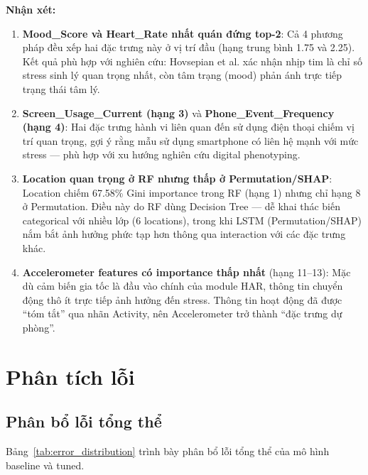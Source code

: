 \textbf{Nhận xét:}

\begin{enumerate}
    \item \textbf{Mood\_Score và Heart\_Rate nhất quán đứng top-2}: Cả 4 phương pháp đều xếp hai đặc trưng này ở vị trí đầu (hạng trung bình 1.75 và 2.25). Kết quả phù hợp với nghiên cứu: Hovsepian et al. \cite{hovsepian2015cstress} xác nhận nhịp tim là chỉ số stress sinh lý quan trọng nhất, còn tâm trạng (mood) phản ánh trực tiếp trạng thái tâm lý.
    
    \item \textbf{Screen\_Usage\_Current (hạng 3)} và \textbf{Phone\_Event\_Frequency (hạng 4)}: Hai đặc trưng hành vi liên quan đến sử dụng điện thoại chiếm vị trí quan trọng, gợi ý rằng mẫu sử dụng smartphone có liên hệ mạnh với mức stress — phù hợp với xu hướng nghiên cứu digital phenotyping.
    
    \item \textbf{Location quan trọng ở RF nhưng thấp ở Permutation/SHAP}: Location chiếm 67.58\% Gini importance trong RF (hạng 1) nhưng chỉ hạng 8 ở Permutation. Điều này do RF dùng Decision Tree — dễ khai thác biến categorical với nhiều lớp (6 locations), trong khi LSTM (Permutation/SHAP) nắm bắt ảnh hưởng phức tạp hơn thông qua interaction với các đặc trưng khác.
    
    \item \textbf{Accelerometer features có importance thấp nhất} (hạng 11--13): Mặc dù cảm biến gia tốc là đầu vào chính của module HAR, thông tin chuyển động thô ít trực tiếp ảnh hưởng đến stress. Thông tin hoạt động đã được ``tóm tắt'' qua nhãn Activity, nên Accelerometer trở thành ``đặc trưng dự phòng''.
\end{enumerate}


\section{Phân tích lỗi}
\label{sec:error_analysis}

\subsection{Phân bổ lỗi tổng thể}
\label{subsec:error_distribution}

Bảng~\ref{tab:error_distribution} trình bày phân bổ lỗi tổng thể của mô hình baseline và tuned.

